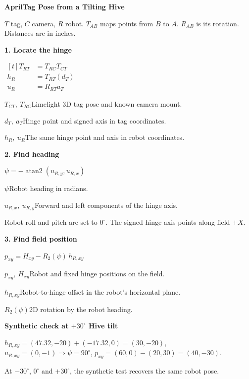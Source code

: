 \documentclass[border=0pt]{standalone}
\newcommand{\key}[2]{\noindent \(#1\)\enspace #2\par}
\begin{document}
\colorbox{panel}{%
\begin{minipage}[t][67mm][t]{202mm}
\color{white}
\begin{adjustbox}{minipage=202mm,max totalsize={202mm}{67mm}}
\raggedright
{\large\bfseries AprilTag Pose from a Tilting Hive\par}
{\small \(T\) tag, \(C\) camera, \(R\) robot.
 \(T_{AB}\) maps points from \(B\) to \(A\).
 \(R_{AB}\) is its rotation. Distances are in inches.\par}
\medskip

\begin{minipage}[t]{0.33\linewidth}
\raggedright
\textbf{1. Locate the hinge}\par
\smallskip
\(\begin{aligned}[t]
T_{RT} &= T_{RC} T_{CT}\\
h_R &= T_{RT}(d_T)\\
u_R &= R_{RT}a_T
\end{aligned}\)\par
\smallskip
\small
\key{T_{CT},\ T_{RC}}{Limelight 3D tag pose and known camera mount.}
\key{d_T,\ a_T}{Hinge point and signed axis in tag coordinates.}
\key{h_R,\ u_R}{The same hinge point and axis in robot coordinates.}
\end{minipage}\hfill
%
\begin{minipage}[t]{0.28\linewidth}
\raggedright
\textbf{2. Find heading}\par
\smallskip
\(\displaystyle\psi=-\operatorname{atan2}(u_{R,y},u_{R,x})\)\par
\smallskip
\small
\key{\psi}{Robot heading in radians.}
\key{u_{R,x},\ u_{R,y}}{Forward and left components of the hinge axis.}
Robot roll and pitch are set to \(0^\circ\).
The signed hinge axis points along field \(+X\).
\end{minipage}\hfill
%
\begin{minipage}[t]{0.34\linewidth}
\raggedright
\textbf{3. Find field position}\par
\smallskip
{\setlength{\fboxsep}{3pt}%
\(\boxed{p_{xy}=H_{xy}-R_2(\psi)\,h_{R,xy}}\)}\par
\smallskip
\small
\key{p_{xy},\ H_{xy}}{Robot and fixed hinge positions on the field.}
\key{h_{R,xy}}{Robot-to-hinge offset in the robot's horizontal plane.}
\key{R_2(\psi)}{2D rotation by the robot heading.}
\end{minipage}\par

\medskip
{\small\textbf{Synthetic check at \(+30^\circ\) Hive tilt}\par
 \(h_{R,xy}=(47.32,-20)+(-17.32,0)=(30,-20)\), \quad
 \(u_{R,xy}=(0,-1)\Rightarrow\psi=90^\circ\), \quad
 \(p_{xy}=(60,0)-(20,30)=(40,-30)\).\par
 At \(-30^\circ\), \(0^\circ\) and \(+30^\circ\), the synthetic test recovers
 the same robot pose.\par}
\end{adjustbox}
\end{minipage}%
}
\end{document}
